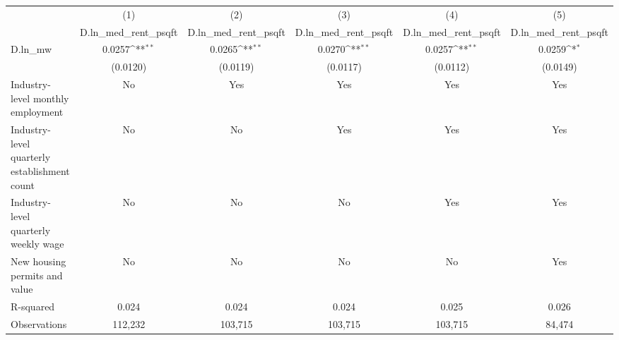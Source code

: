 {
\def\sym#1{\ifmmode^{#1}\else\(^{#1}\)\fi}
\begin{tabular}{l*{5}{c}}
\hline\hline
          &\multicolumn{1}{c}{(1)}&\multicolumn{1}{c}{(2)}&\multicolumn{1}{c}{(3)}&\multicolumn{1}{c}{(4)}&\multicolumn{1}{c}{(5)}\\
          &\multicolumn{1}{c}{D.ln\_med\_rent\_psqft}&\multicolumn{1}{c}{D.ln\_med\_rent\_psqft}&\multicolumn{1}{c}{D.ln\_med\_rent\_psqft}&\multicolumn{1}{c}{D.ln\_med\_rent\_psqft}&\multicolumn{1}{c}{D.ln\_med\_rent\_psqft}\\
\hline
D.ln\_mw   &   0.0257\sym{**} &   0.0265\sym{**} &   0.0270\sym{**} &   0.0257\sym{**} &   0.0259\sym{*}  \\
          & (0.0120)         & (0.0119)         & (0.0117)         & (0.0112)         & (0.0149)         \\
\hline
Industry-level monthly employment&       No         &      Yes         &      Yes         &      Yes         &      Yes         \\
Industry-level quarterly establishment count&       No         &       No         &      Yes         &      Yes         &      Yes         \\
Industry-level quarterly weekly wage&       No         &       No         &       No         &      Yes         &      Yes         \\
New housing permits and value&       No         &       No         &       No         &       No         &      Yes         \\
R-squared &    0.024         &    0.024         &    0.024         &    0.025         &    0.026         \\
Observations&  112,232         &  103,715         &  103,715         &  103,715         &   84,474         \\
\hline\hline
\end{tabular}
}
